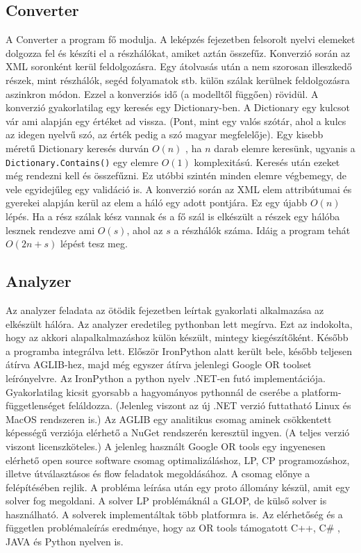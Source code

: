 \subsection{Converter}
A Converter a program fő modulja. A leképzés fejezetben felsorolt nyelvi elemeket dolgozza fel és készíti el a részhálókat, amiket aztán összefűz. Konverzió során az XML soronként kerül feldolgozásra. Egy átolvasás után a nem szorosan illeszkedő részek, mint részhálók, segéd folyamatok stb. külön szálak kerülnek feldolgozásra aszinkron módon. Ezzel a konverziós idő (a modelltől függően) rövidül. A konverzió gyakorlatilag egy keresés egy Dictionary-ben. A Dictionary egy kulcsot vár ami alapján egy értéket ad vissza. (Pont, mint egy valós szótár, ahol a kulcs az idegen nyelvű szó, az érték pedig a szó magyar megfelelője). Egy kisebb méretű Dictionary keresés durván $O(n)$ , ha $n$ darab elemre keresünk, ugyanis a \texttt{Dictionary.Contains()} egy elemre $O(1)$ komplexitású. Keresés után ezeket még rendezni kell és összefűzni. Ez utóbbi szintén minden elemre végbemegy, de vele egyidejűleg egy validáció is. A konverzió során az XML elem attribútumai és gyerekei alapján kerül az elem a háló egy adott pontjára. Ez egy újabb $O(n)$ lépés. Ha a rész szálak kész vannak és a fő szál is elkészült a részek egy hálóba lesznek rendezve ami $O(s)$, ahol az $s$ a részhálók száma. Idáig a program tehát $O(2n+s)$ lépést tesz meg. 
\subsection{Analyzer}
Az analyzer feladata az ötödik %
 fejezetben leírtak gyakorlati alkalmazása az elkészült hálóra. Az analyzer eredetileg pythonban lett megírva. Ezt az indokolta, hogy az akkori alapalkalmazáshoz külön készült, mintegy kiegészítőként. Később a programba integrálva lett. Először IronPython alatt került bele, később teljesen átírva AGLIB-hez, majd még egyszer átírva jelenlegi Google OR toolset leírónyelvre. Az IronPython a python nyelv .NET-en futó implementációja. Gyakorlatilag kicsit gyorsabb a hagyományos pythonnál de cserébe a platform-függetlenséget feláldozza. (Jelenleg viszont az új .NET verzió futtatható Linux és MacOS rendszeren is.) Az AGLIB egy analitikus csomag aminek csökkentett képességű verziója elérhető a NuGet rendszerén keresztül ingyen. (A teljes verzió viszont licenszköteles.) A jelenleg használt Google OR tools egy ingyenesen elérhető open source software csomag optimalizáláshoz, LP, CP programozáshoz, illetve útválasztásos és flow feladatok megoldásához. A csomag előnye a felépítésében rejlik. A probléma leírása után egy proto állomány  készül, amit egy solver fog megoldani. A solver LP problémáknál a GLOP, de külső solver is használható. A solverek implementáltak több platformra is. Az elérhetőség és a független problémaleírás eredménye, hogy az OR tools támogatott C++, C\# , JAVA és Python nyelven is.
 
